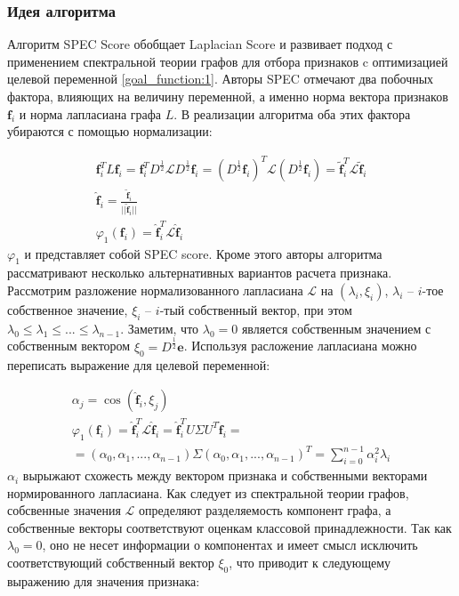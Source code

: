 \subsubsection{Идея алгоритма}
Алгоритм SPEC Score обобщает Laplacian Score и развивает подход с применением спектральной теории графов для отбора признаков c оптимизацией целевой переменной \ref{goal_function:1}. Авторы SPEC отмечают два побочных фактора, влияющих на величину переменной, а именно норма вектора признаков $\mathbf{f}_i $ и норма лапласиана графа $L$. В реализации алгоритма оба этих фактора убираются с помощью нормализации:

\begin{equation}
	\begin{array}{l}
	\mathbf{f}_i^T L \mathbf{f}_i = \mathbf{f}_i^T D^\frac12 \mathcal{L} D^\frac12 \mathbf{f}_i = (D^\frac12 \mathbf{f}_i)^T \mathcal{L} (D^\frac12 \mathbf{f}_i) = \widetilde{\mathbf{f}}_i^T \mathcal{L} \widetilde{\mathbf{f}}_i \\
	\widehat{\mathbf{f}}_i = \frac{\widetilde{\mathbf{f}}_i}{||\widetilde{\mathbf{f}}_i||} \\
	\varphi_1(\mathbf{f}_i) = \widehat{\mathbf{f}}_i^T \mathcal{L} \widehat{\mathbf{f}}_i
	\end{array}
\end{equation}
$\varphi_1$ и представляет собой SPEC score. Кроме этого авторы алгоритма рассматривают несколько альтернативных вариантов расчета признака. Рассмотрим разложение нормализованного лапласиана $\mathcal{L}$ на $(\lambda_i, \xi_i)$, $\lambda_i$ -- $i$-тое собственное значение, $\xi_i$ -- $i$-тый собственный вектор, при этом $\lambda_0 \leq \lambda_1 \leq ... \leq \lambda_{n-1}$. Заметим, что $\lambda_0 = 0$ является собственным значением с собственным вектором $\xi_0 = D^\frac12 \mathbf{e}$. Используя расложение лапласиана можно переписать выражение для целевой переменной:

\begin{equation}
	\begin{array}{l}
		\alpha_j = \cos(\widehat{\mathbf{f}}_i, \xi_j)\\
		\varphi_1(\mathbf{f}_i) = \widehat{\mathbf{f}}_i^T \mathcal{L} \widehat{\mathbf{f}}_i = \widehat{\mathbf{f}}_i^T U \Sigma U^T \widehat{\mathbf{f}}_i = \\
		= (\alpha_0, \alpha_1, ... , \alpha_{n-1}) \Sigma (\alpha_0, \alpha_1, ... , \alpha_{n-1})^T = \sum_{i=0}^{n-1} \alpha_i^2 \lambda_i
	\end{array} 
\end{equation}
$\alpha_i$ вырыжают схожесть между вектором признака и собственными векторами нормированного лапласиана. Как следует из спектральной теории графов, собсвенные значения $\mathcal{L}$ определяют разделяемость компонент графа, а собственные векторы соответствуют оценкам классовой принадлежности. Так как $\lambda_0 = 0$, оно не несет информации о компонентах и имеет смысл исключить соответствующий собственный вектор $\xi_0$, что приводит к следующему выражению для значения признака:

